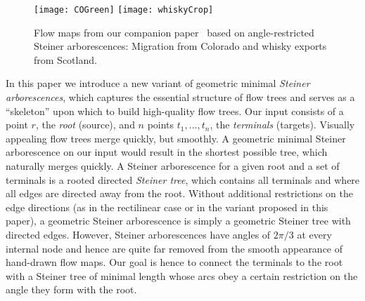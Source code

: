\documentclass{journalA4}
\begin{document}
\begin{figure}[t]
\centering
\texttt{[image: COGreen]}
\hfill
\texttt{[image: whiskyCrop]}
\caption{Flow maps from our companion paper~\cite{InfoVisFlowMap} based on angle-restricted Steiner arborescences: Migration from Colorado and whisky exports from Scotland.}
\label{fig:flowmaps}
\end{figure}
In this paper we introduce a new variant of geometric minimal \emph{Steiner arborescences}, which captures the essential structure of flow trees and serves as a ``skeleton'' upon which to build high-quality flow trees. Our input consists of a point $r$, the \emph{root} (source), and $n$ points $t_1, \ldots, t_n$, the \emph{terminals} (targets). Visually appealing flow trees merge quickly, but smoothly. A geometric minimal Steiner arborescence on our input would result in the shortest possible tree, which naturally merges quickly. A Steiner arborescence for a given root and a set of terminals is a rooted directed \emph{Steiner tree}, which contains all terminals and where all edges are directed away from the root. Without additional restrictions on the edge directions (as in the rectilinear case or in the variant proposed in this paper), a geometric Steiner arborescence is simply a geometric Steiner tree with directed edges. However, Steiner arborescences have angles of $2\pi/3$ at every internal node and hence are quite far removed from the smooth appearance of hand-drawn flow maps. Our goal is hence to connect the terminals to the root with a Steiner tree of minimal length whose arcs obey a certain restriction on the angle they form with the root.
\end{document}
